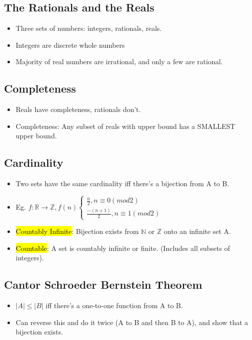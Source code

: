 \subsection{The Rationals and the Reals}
\begin{itemize}
    \item Three sets of numbers: integers, rationals, reals.
    \item Integers are discrete whole numbers
    \item Majority of real numbers are irrational, and only a few are rational.
\end{itemize}

\subsection{Completeness}
\begin{itemize}
    \item Reals have completeness, rationals don't.
    \item Completeness: Any subset of reals with upper bound has a SMALLEST upper bound.
\end{itemize}

\subsection{Cardinality}
\begin{itemize}
    \item Two sets have the same cardinality iff there's a bijection from A to B.
    \item Eg. $f: \mathbb{R}\rightarrow\mathbb{Z}, f(n)\begin{cases}
         \frac{n}{2}, n\equiv0(mod2) \\
        \frac{-(n+1)}{2}, n\equiv1(mod2)
    \end{cases}$
    \item \hl{Countably Infinite}: Bijection exists from $\mathbb{N}$ or $\mathbb{Z}$ onto an infinite set A.
    \item \hl{Countable}: A set is countably infinite or finite. (Includes all subsets of integers).
\end{itemize}

\subsection{Cantor Schroeder Bernstein Theorem}
\begin{itemize}
    \item $|A| \leq |B|$ iff there's a one-to-one function from A to B.
    \item Can reverse this and do it twice (A to B and then B to A), and show that a bijection exists.
\end{itemize}